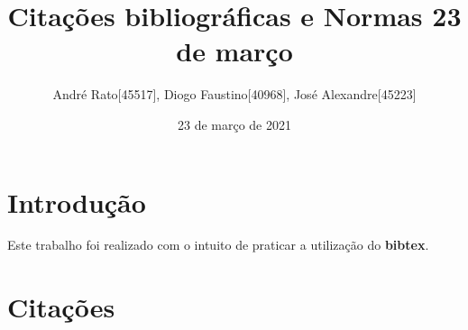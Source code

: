 \documentclass{article}
\title{Citações bibliográficas e Normas 23 de março}
\author{André Rato[45517], Diogo Faustino[40968], José Alexandre[45223]}
\date{23 de março de 2021}
\begin{document}
\maketitle

\section{Introdução}
Este trabalho foi realizado com o intuito de praticar a utilização do \textbf{bibtex}.

\section{Citações}
\cite{ibmcloud} \cite{elitedatascience} \cite{geeksover}\\
\cite{jmlr1} \cite{jmlr2}\\
\cite{medium} \cite{medium2} \cite{analyticsvidhya}\\
\cite{citeseerx} \cite{yaroslavvb}\\
\cite{towardsdatascience} \cite{dustinstansbury}\\
\cite{pnas} \cite{springer}\\

\printbibliography[title=Referências]
\end{document}
